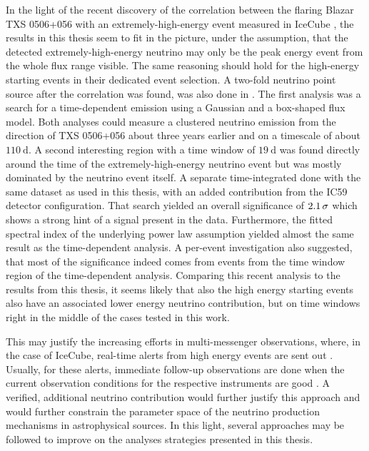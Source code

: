 In the light of the recent discovery of the correlation between the flaring Blazar TXS 0506+056 with an extremely-high-energy event measured in IceCube \cite{IceCube:2018dnn}, the results in this thesis seem to fit in the picture, under the assumption, that the detected extremely-high-energy neutrino may only be the peak energy event from the whole flux range visible.
The same reasoning should hold for the high-energy starting events in their dedicated event selection.
A two-fold neutrino point source after the correlation was found, was also done in \cite{IceCube:2018cha}.
The first analysis was a search for a time-dependent emission using a Gaussian and a box-shaped flux model.
Both analyses could measure a clustered neutrino emission from the direction of TXS 0506+056 about three years earlier and on a timescale of about $\SI{110}{\day}$.
A second interesting region with a time window of $\SI{19}{\day}$ was found directly around the time of the extremely-high-energy neutrino event but was mostly dominated by the neutrino event itself.
A separate time-integrated done with the same dataset as used in this thesis, with an added contribution from the IC59 detector configuration.
That search yielded an overall significance of $\num{2.1}\,\sigma$ which shows a strong hint of a signal present in the data.
Furthermore, the fitted spectral index of the underlying power law assumption yielded almost the same result as the time-dependent analysis.
A per-event investigation also suggested, that most of the significance indeed comes from events from the time window region of the time-dependent analysis.
Comparing this recent analysis to the results from this thesis, it seems likely that also the high energy starting events also have an associated lower energy neutrino contribution, but on time windows right in the middle of the cases tested in this work.

This may justify the increasing efforts in multi-messenger observations, where, in the case of IceCube, real-time alerts from high energy events are sent out \cite{Aartsen:2016lmt}.
Usually, for these alerts, immediate follow-up observations are done when the current observation conditions for the respective instruments are good \cite{DeLotto:2017ggz}.
A verified, additional neutrino contribution would further justify this approach and would further constrain the parameter space of the neutrino production mechanisms in astrophysical sources.
In this light, several approaches may be followed to improve on the analyses strategies presented in this thesis.

